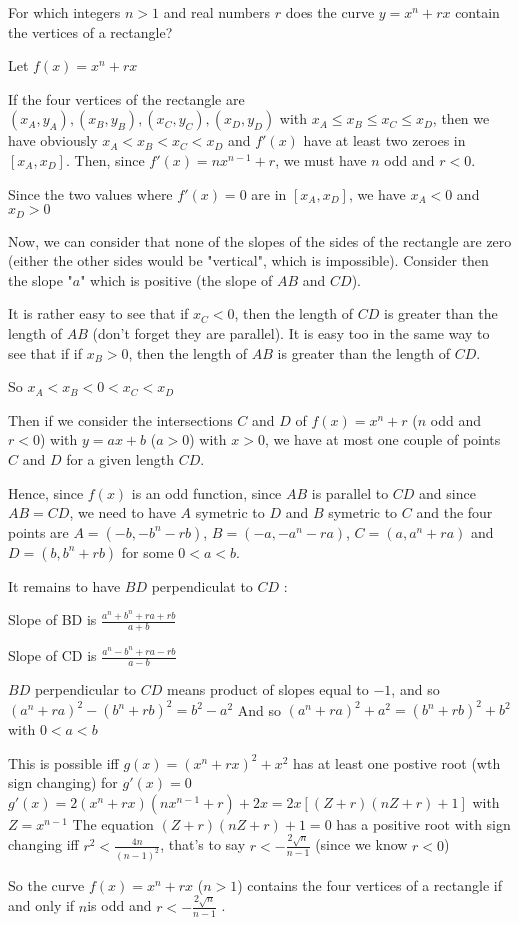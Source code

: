 \begin{mysolution}
	\begin{tcolorbox}For which integers $ n>1$ and real numbers $ r$ does the curve $ y=x^{n}+rx$ contain the vertices of a rectangle?\end{tcolorbox}

Let $ f(x)=x^{n}+rx$ 

If the four vertices of the rectangle are $ (x_{A},y_{A}), (x_{B},y_{B}), (x_{C},y_{C}), (x_{D},y_{D})$ with $ x_{A}\leq x_{B}\leq x_{C}\leq x_{D}$, then we have obviously $ x_{A}< x_{B}< x_{C}< x_{D}$ and $ f'(x)$ have at least two zeroes in $ [x_{A},x_{D}]$. Then, since $ f'(x)=nx^{n-1}+r$, we must have $ n$ odd and $ r<0$.

Since the two values where $ f'(x)=0$ are in $ [x_{A},x_{D}]$, we have $ x_{A}<0$ and $ x_{D}>0$

Now, we can consider that none of the slopes of the sides of the rectangle are zero (either the other sides would be "vertical", which is impossible). Consider then the slope "$ a$" which is positive (the slope of $ AB$ and $ CD$).

It is rather easy to see that if $ x_{C}<0$, then the length of $ CD$ is greater than the length of $ AB$ (don't forget they are parallel).
It is easy too in the same way to see that if if $ x_{B}>0$, then the length of $ AB$ is greater than the length of $ CD$.

So  $ x_{A}< x_{B}< 0 < x_{C}< x_{D}$ 

Then if we consider the intersections $ C$ and $ D$ of $ f(x)=x^{n}+r$ ($ n$ odd and $ r<0$) with $ y=ax+b$ ($ a>0$) with $ x>0$, we have at most one couple of points $ C$ and $ D$ for a given length $ CD$.

Hence, since $ f(x)$ is an odd function, since $ AB$ is parallel to $ CD$ and since $ AB=CD$, we need to have $ A$ symetric to $ D$ and $ B$ symetric to $ C$ and the four points are $ A=(-b,-b^{n}-rb)$, $ B=(-a,-a^{n}-ra)$, $ C=(a,a^{n}+ra)$ and $ D=(b,b^{n}+rb)$ for some $ 0< a<b$.

It remains to have $ BD$ perpendiculat to $ CD$ :

Slope of BD is $ \frac{a^{n}+b^{n}+ra+rb}{a+b}$

Slope of CD is $ \frac{a^{n}-b^{n}+ra-rb}{a-b}$

$ BD$ perpendicular to $ CD$ means product of slopes equal to $ -1$, and so $ (a^{n}+ra)^{2}-(b^{n}+rb)^{2}=b^{2}-a^{2}$
And so $ (a^{n}+ra)^{2}+a^{2}=(b^{n}+rb)^{2}+b^{2}$ with $ 0<a<b$

This is possible iff $ g(x)=(x^{n}+rx)^{2}+x^{2}$ has at least one postive root (wth sign changing) for $ g'(x)=0$
$ g'(x)=2(x^{n}+rx)(nx^{n-1}+r)+2x = 2x[(Z+r)(nZ+r)+1]$ with $ Z=x^{n-1}$
The equation $ (Z+r)(nZ+r)+1=0$ has a positive root with sign changing iff $ r^{2}<\frac{4n}{(n-1)^{2}}$, that's to say $ r<-\frac{2\sqrt{n}}{n-1}$ (since we know $ r<0$)

So the curve $ f(x)=x^{n}+rx$ ($ n>1$) contains the four vertices of a rectangle if and only if $ n$is odd and  $ r<-\frac{2\sqrt{n}}{n-1}$ .
\end{mysolution}

